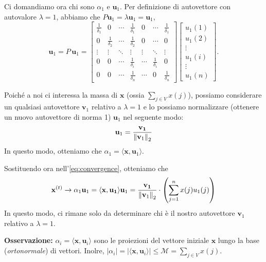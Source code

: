 Ci domandiamo ora chi sono $\alpha_1$ e $\mathbf{u}_1$. Per definizione di autovettore con autovalore $\lambda = 1$, abbiamo che $P \mathbf{u}_1 = \lambda \mathbf{u}_1 = \mathbf{u}_1$,
\[
\mathbf{u}_1 = P\,\mathbf{u}_1 =
\begin{bmatrix}
\frac{1}{\delta_1} & 0 & \cdots & \frac{1}{\delta_1} & 0 & \cdots & \frac{1}{\delta_1} \\
0 & \frac{1}{\delta_2} & \cdots & \frac{1}{\delta_2} & 0 & \cdots & 0 \\
\vdots & \vdots & \ddots & \vdots & \vdots & \ddots & \vdots \\
0 & 0 & \cdots & \frac{1}{\delta_i} & \cdots & \frac{1}{\delta_i} & 0 \\
0 & 0 & \cdots & \frac{1}{\delta_n} & \cdots & 0 & \frac{1}{\delta_n}
\end{bmatrix}
\begin{bmatrix}
u_1(1) \\
u_1(2) \\
\vdots \\
u_1(i) \\
\vdots \\
u_1(n)
\end{bmatrix}.
\]

Poiché a noi ci interessa la massa di $\mathbf{x}$ (ossia $\sum_{j \in V} x(j)$), possiamo considerare un qualsiasi autovettore $\mathbf{v}_1$ relativo a $\lambda = 1$ e lo possiamo normalizzare (ottenere un nuovo autovettore di norma 1) $\mathbf{u}_1$ nel seguente modo:
\[
    \mathbf{u}_1 = \frac{\mathbf{v_1}}{\norm{\mathbf{v}_1}_2}
\]
In questo modo, otteniamo che $\alpha_1 = \langle \mathbf{x}, \mathbf{u}_1 \rangle$.

Sostituendo ora nell'\autoref{eq:convergence}, otteniamo che
\begin{equation}\label{eq:convergence2}
    \mathbf{x}^{(t)} \to \alpha_1\mathbf{u}_1 = \langle \mathbf{x}, \mathbf{u_1} \rangle \mathbf{u}_1 = \frac{\mathbf{v_1}}{\norm{\mathbf{v}_1}_2} \cdot \left( \sum_{j = 1}^{n} x(j)u_1(j) \right)
\end{equation}
In questo modo, ci rimane solo da determinare chi è il nostro autovettore $\mathbf{v}_1$ relativo a $\lambda = 1$.

\textbf{Osservazione:} $\alpha_i = \langle \mathbf{x}, \mathbf{u}_i \rangle$ sono le proiezioni del vettore iniziale $\mathbf{x}$ lungo la base (\textit{ortonormale}) di vettori. Inolre, $|\alpha_i| = |\langle \mathbf{x}, \mathbf{u}_i \rangle| \leq \mathcal{M} = \sum_{j \in V} x(j)$.


